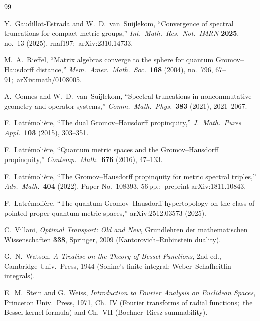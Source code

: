 \documentclass[11pt,a4paper]{article}
\theoremstyle{plain}
\theoremstyle{definition}
\begin{document}
\begin{thebibliography}{99}

Y.~Gaudillot-Estrada and W.~D.~van~Suijlekom, ``Convergence of spectral
truncations for compact metric groups,'' \textit{Int.~Math.~Res.~Not.\
IMRN} \textbf{2025}, no.~13 (2025), rnaf197;\ arXiv:2310.14733.

M.~A.~Rieffel, ``Matrix algebras converge to the sphere for quantum
Gromov--Hausdorff distance,'' \textit{Mem.~Amer.~Math.~Soc.}\ \textbf{168}
(2004), no.~796, 67--91;\ arXiv:math/0108005.

A.~Connes and W.~D.~van~Suijlekom, ``Spectral truncations in
noncommutative geometry and operator systems,''
\textit{Comm.~Math.~Phys.}\ \textbf{383} (2021), 2021--2067.

F.~Latr\'emoli\`ere, ``The dual Gromov--Hausdorff propinquity,''
\textit{J.~Math.~Pures Appl.}\ \textbf{103} (2015), 303--351.

F.~Latr\'emoli\`ere, ``Quantum metric spaces and the Gromov--Hausdorff
propinquity,'' \textit{Contemp.~Math.}\ \textbf{676} (2016), 47--133.

F.~Latr\'emoli\`ere, ``The Gromov--Hausdorff propinquity for metric
spectral triples,'' \textit{Adv.~Math.}\ \textbf{404} (2022), Paper
No.~108393, 56\,pp.;\ preprint arXiv:1811.10843.

F.~Latr\'emoli\`ere, ``The quantum Gromov--Hausdorff hypertopology on
the class of pointed proper quantum metric spaces,'' arXiv:2512.03573
(2025).

C.~Villani, \textit{Optimal Transport: Old and New}, Grundlehren der
mathematischen Wissenschaften \textbf{338}, Springer, 2009
(Kantorovich--Rubinstein duality).

G.~N.~Watson, \textit{A Treatise on the Theory of Bessel Functions},
2nd ed., Cambridge Univ.\ Press, 1944 (Sonine's finite integral;
Weber--Schafheitlin integrals).

E.~M.~Stein and G.~Weiss, \textit{Introduction to Fourier Analysis on
Euclidean Spaces}, Princeton Univ.\ Press, 1971, Ch.~IV (Fourier
transforms of radial functions;\ the Bessel-kernel formula) and Ch.~VII
(Bochner--Riesz summability).


\end{thebibliography}
\end{document}
